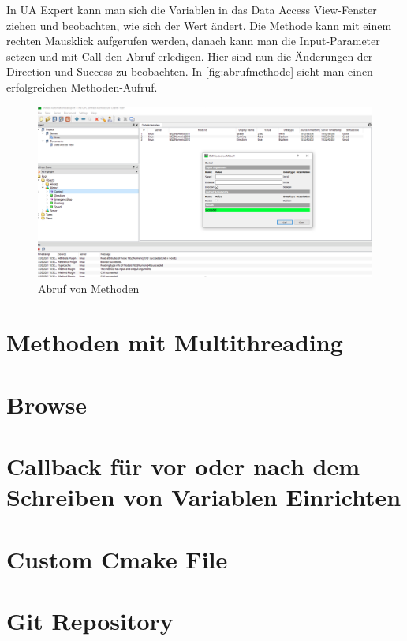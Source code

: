 In UA Expert kann man sich die Variablen in das Data Access View-Fenster ziehen und beobachten, wie sich der Wert ändert. 
Die Methode kann mit einem rechten Mausklick aufgerufen werden, danach kann man die Input-Parameter setzen und mit Call den Abruf erledigen. Hier sind nun die Änderungen der Direction und Success zu beobachten. In \autoref{fig:abrufmethode} sieht man einen erfolgreichen Methoden-Aufruf.

\begin{figure}[H]
	\centering
	\includegraphics[width=1\linewidth]{abb/AbrufMethode}
	\caption{Abruf von Methoden}
	\label{fig:abrufmethode}
\end{figure}


\section{Methoden mit Multithreading}

\section{Browse}

\section{Callback für vor oder nach dem Schreiben von Variablen Einrichten}

\section{Custom Cmake File}

\section{Git Repository}